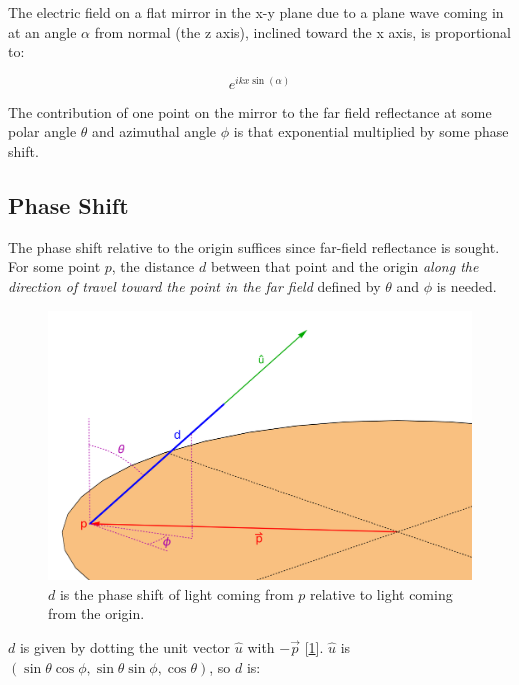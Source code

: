 \documentclass[etd,twoside,senior,noacknowledgments]{BYUPhys}
\begin{document}
The electric field on a flat mirror in the x-y plane due to a plane wave coming in at an angle $\alpha$ from normal (the z axis), inclined toward the x axis, is proportional to:

\begin{equation}
  e^{ikx\sin\left({\alpha}\right)}
\end{equation}

The contribution of one point on the mirror to the far field reflectance at some polar angle $\theta$ and azimuthal angle $\phi$ is that exponential multiplied by some phase shift.

\subsection{Phase Shift} \label{sec:phase_shift}

The phase shift relative to the origin suffices since far-field reflectance is sought. For some point $p$, the distance $d$ between that point and the origin \textit{along the direction of travel toward the point in the far field} defined by $\theta$ and $\phi$ is needed.

\begin{figure}
  \centerline{\includegraphics[width=\textwidth]{phase-length}}
  \caption[Phase length of a beam of light]{\label{fig:phase_length}
    $d$ is the phase shift of light coming from $p$ relative to light coming from the origin.}
\end{figure}

$d$ is given by dotting the unit vector $\hat{u}$ with $-\vec{p}$ [\ref{fig:phase_length}]. $\hat{u}$ is $\left(\sin{\theta}\cos{\phi},\sin{\theta}\sin{\phi},\cos{\theta}\right)$, so $d$ is:
\end{document}
